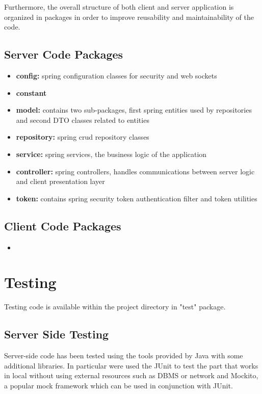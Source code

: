 \documentclass[a4paper]{article}
\begin{document}
Furthermore, the overall structure of both client and server application is organized in packages in order to improve reusability and maintainability of the code.

\subsection{Server Code Packages}
\begin{itemize}
\item \textbf{config:} spring configuration classes for security and web sockets
\item \textbf{constant}
\item \textbf{model:} contains two sub-packages, first spring entities used by repositories and second DTO classes related to entities
\item \textbf{repository:} spring crud repository classes
\item \textbf{service:} spring services, the business logic of the application
\item \textbf{controller:} spring controllers, handles communications between server logic and client presentation layer
\item \textbf{token:} contains spring security token authentication filter and token utilities
\end{itemize}

\subsection{Client Code Packages}
\begin{itemize}
\item[]
\end{itemize}

\newpage
\section{Testing}
Testing code is available within the project directory in "test" package.

\subsection{Server Side Testing}
Server-side code has been tested using the tools provided by Java with some additional libraries. In particular were used the JUnit to test the part that works in local without using external resources such as DBMS or network and Mockito, a popular mock framework which can be used in conjunction with JUnit.
\end{document}
